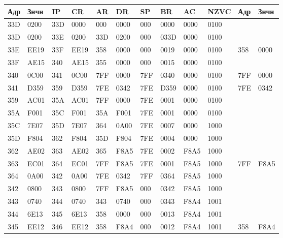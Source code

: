 \begin{table}[!ht]
    \centering
    \begin{tabular}{|l|l|l|l|l|l|l|l|l|l|l|l|}
    \hline
        \textbf{Адр} & \textbf{Знчн} & \textbf{IP} & \textbf{CR} & \textbf{AR} & \textbf{DR} & \textbf{SP} & \textbf{BR} & \textbf{AC} & \textbf{NZVC} & \textbf{Адр} & \textbf{Знчн} \\ \hline
        33D & 0200 & 33D & 0000 & 000 & 0000 & 000 & 0000 & 0000 & 0100 & ~ & ~ \\ \hline
        33D & 0200 & 33E & 0200 & 33D & 0200 & 000 & 033D & 0000 & 0100 & ~ & ~ \\ \hline
        33E & EE19 & 33F & EE19 & 358 & 0000 & 000 & 0019 & 0000 & 0100 & 358 & 0000 \\ \hline
        33F & AE15 & 340 & AE15 & 355 & 0000 & 000 & 0015 & 0000 & 0100 & ~ & ~ \\ \hline
        340 & 0C00 & 341 & 0C00 & 7FF & 0000 & 7FF & 0340 & 0000 & 0100 & 7FF & 0000 \\ \hline
        341 & D359 & 359 & D359 & 7FE & 0342 & 7FE & D359 & 0000 & 0100 & 7FE & 0342 \\ \hline
        359 & AC01 & 35A & AC01 & 7FF & 0000 & 7FE & 0001 & 0000 & 0100 & ~ & ~ \\ \hline
        35A & F001 & 35C & F001 & 35A & F001 & 7FE & 0001 & 0000 & 0100 & ~ & ~ \\ \hline
        35C & 7E07 & 35D & 7E07 & 364 & 0A00 & 7FE & 0007 & 0000 & 1000 & ~ & ~ \\ \hline
        35D & F804 & 362 & F804 & 35D & F804 & 7FE & 0004 & 0000 & 1000 & ~ & ~ \\ \hline
        362 & AE02 & 363 & AE02 & 365 & F8A5 & 7FE & 0002 & F8A5 & 1000 & ~ & ~ \\ \hline
        363 & EC01 & 364 & EC01 & 7FF & F8A5 & 7FE & 0001 & F8A5 & 1000 & 7FF & F8A5 \\ \hline
        364 & 0A00 & 342 & 0A00 & 7FE & 0342 & 7FF & 0364 & F8A5 & 1000 & ~ & ~ \\ \hline
        342 & 0800 & 343 & 0800 & 7FF & F8A5 & 000 & 0342 & F8A5 & 1000 & ~ & ~ \\ \hline
        343 & 0740 & 344 & 0740 & 343 & 0740 & 000 & 0343 & F8A4 & 1001 & ~ & ~ \\ \hline
        344 & 6E13 & 345 & 6E13 & 358 & 0000 & 000 & 0013 & F8A4 & 1001 & ~ & ~ \\ \hline
        345 & EE12 & 346 & EE12 & 358 & F8A4 & 000 & 0012 & F8A4 & 1001 & 358 & F8A4 \\ \hline

\end{tabular}
\end{table}
